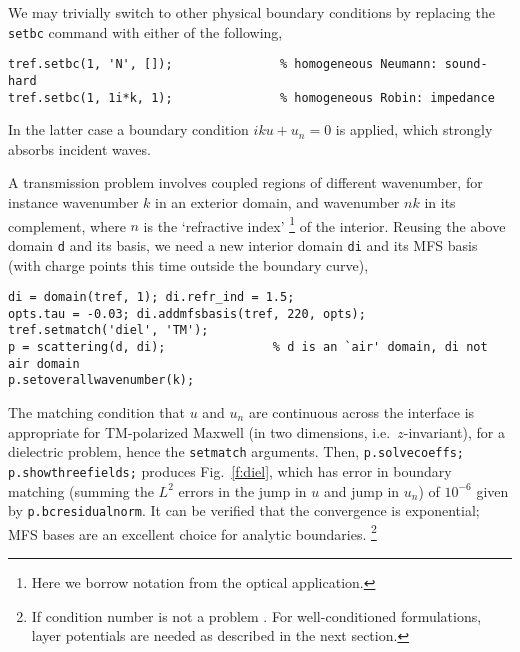 We may trivially switch to other physical boundary conditions by replacing
the {\tt setbc} command with either of the following,
\begin{verbatim}
tref.setbc(1, 'N', []);               % homogeneous Neumann: sound-hard
tref.setbc(1, 1i*k, 1);               % homogeneous Robin: impedance
\end{verbatim}
In the latter case a boundary condition $iku + u_n=0$ is applied, which
strongly absorbs incident waves.

\bfi %
\efi

A transmission problem involves coupled regions of different wavenumber,
for instance wavenumber $k$ in an exterior domain, and wavenumber $nk$ in
its complement, where $n$ is the `refractive index'%
  \footnote{Here we borrow notation from the optical application.}
of the interior.
Reusing the above domain {\tt d} and its basis, we need a new interior domain
{\tt di}
and its MFS basis (with charge points this time outside the boundary curve),
\begin{verbatim}
di = domain(tref, 1); di.refr_ind = 1.5;
opts.tau = -0.03; di.addmfsbasis(tref, 220, opts);
tref.setmatch('diel', 'TM');
p = scattering(d, di);               % d is an `air' domain, di not air domain
p.setoverallwavenumber(k);
\end{verbatim}
The matching condition that $u$ and $u_n$ are continuous across the interface
is appropriate for TM-polarized Maxwell (in two dimensions, i.e.\
$z$-invariant), for a dielectric problem, hence the {\tt setmatch}
arguments.
Then, {\tt p.solvecoeffs; p.showthreefields;} produces
Fig.~\ref{f:diel}, which has error in boundary matching
(summing the $L^2$ errors in the jump in $u$ and jump in $u_n$)
of $10^{-6}$ given by {\tt p.bcresidualnorm}.
It can be verified that the convergence is exponential; MFS bases are an
excellent choice for analytic boundaries.%
  \footnote{If condition number is not a problem \cite{mfs}.
    For well-conditioned
    formulations, layer potentials are needed as described in the next
    section.}

